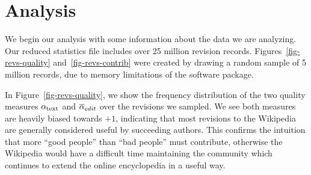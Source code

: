 \section{Analysis}

We begin our analysis with some information about the data
we are analyzing.
Our reduced statistics file includes over 25 million revision
records.
Figures~\ref{fig-revs-quality} and~\ref{fig-revs-contrib} were
created by drawing a random sample of 5 million records,
due to memory limitations of the software package.

In Figure~\ref{fig-revs-quality}, we show the frequency distribution
of the two quality measures
$\alpha_\text{text}$ and ${\overline{\alpha}}_{edit}$ over the revisions we sampled.
We see both measures are heavily biased towards $+1$, indicating that
most revisions to the Wikipedia are generally considered useful
by succeeding authors.
This confirms the intuition that more ``good people'' than
``bad people'' must contribute, otherwise the Wikipedia would
have a difficult time maintaining the community which
continues to extend the online encyclopedia in a useful way.
%

